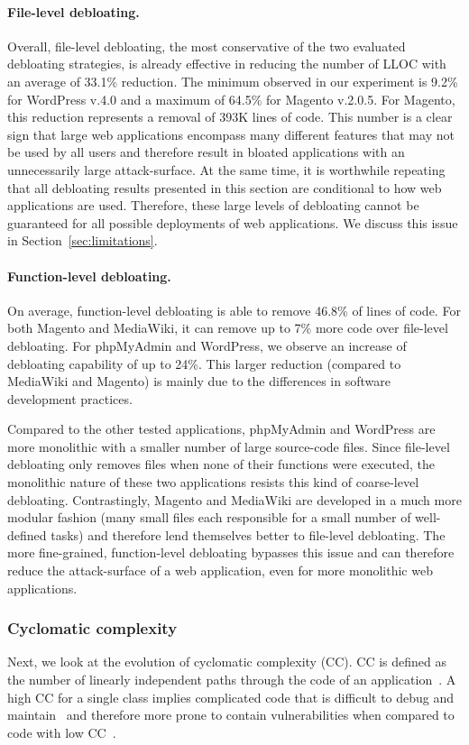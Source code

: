 \paragraph{File-level debloating.}
Overall, file-level debloating, the most conservative of the two evaluated
debloating strategies, is already effective in reducing the number of LLOC with an average of 33.1\% reduction.
The minimum observed in our experiment is 9.2\% for WordPress
v.4.0 and a maximum of 64.5\% for Magento v.2.0.5. For Magento,
this reduction represents a removal of 393K lines of code.
This number is a clear sign that large web applications encompass many
different features that may not be used by all users and therefore result
in bloated applications with an unnecessarily large attack-surface. At the same time, it is worthwhile repeating that all debloating results presented in this section are conditional to how web applications are used. Therefore, these large levels of debloating cannot be guaranteed for all possible deployments of web applications. We discuss this issue in Section~\ref{sec:limitations}.

\paragraph{Function-level debloating.}
On average, function-level debloating is able to remove 46.8\% of lines of code.
For both Magento and MediaWiki, it can remove up to
7\% more code over file-level debloating. For phpMyAdmin and WordPress, we observe an
increase of debloating capability of up to 24\%. This
larger reduction (compared to MediaWiki and Magento) is mainly due to
the differences in software development practices.

Compared to the other
tested applications, phpMyAdmin and WordPress are more monolithic with a smaller number of large
source-code files. Since file-level debloating only removes files when none
of their functions were executed, the monolithic nature of these two applications resists
this kind of coarse-level debloating. Contrastingly, Magento and MediaWiki
are developed in a much more modular fashion (many small files each responsible
for a small number of well-defined tasks) and therefore lend themselves better to file-level
debloating. The more fine-grained, function-level debloating bypasses this
issue and can therefore reduce the attack-surface of a web application,
even for more monolithic web applications.


\subsubsection{Cyclomatic complexity}
\label{subsubsec:cyclomatic-complexity}
Next, we look at the evolution of cyclomatic complexity (CC). CC is defined as
the number of linearly independent paths through the code of
an application~\cite{mccabe1976complexity}. A high CC for a
single class implies complicated code that is difficult to
debug and maintain~\cite{gill1991cyclomatic} and therefore
more prone to contain vulnerabilities when compared to code with low
CC~\cite{shin2008empirical,kurmus2013attack}.

